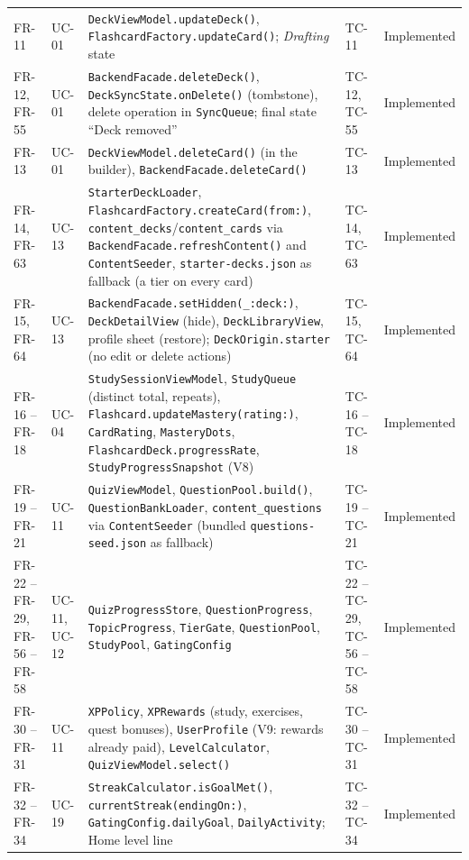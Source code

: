 \documentclass[12pt,letterpaper]{article}
\begin{document}
\begin{xltabular}{\textwidth}{@{}l L{1.6cm} Y L{2.0cm} L{1.9cm}@{}}
FR-11 & UC-01 & \texttt{DeckViewModel.updateDeck()}, \texttt{FlashcardFactory.updateCard()}; \emph{Drafting} state & TC-11 & Implemented \\
FR-12, FR-55 & UC-01 & \texttt{BackendFacade.deleteDeck()}, \texttt{DeckSyncState.onDelete()} (tombstone), delete operation in \texttt{SyncQueue}; final state ``Deck removed'' & TC-12, TC-55 & Implemented \\
FR-13 & UC-01 & \texttt{DeckViewModel.deleteCard()} (in the builder), \texttt{BackendFacade.deleteCard()} & TC-13 & Implemented \\
FR-14, FR-63 & UC-13 & \texttt{StarterDeckLoader}, \texttt{FlashcardFactory.createCard(from:)}, \texttt{content\_decks}/\texttt{content\_cards} via \texttt{BackendFacade.refreshContent()} and \texttt{ContentSeeder}, \texttt{starter-decks.json} as fallback (a tier on every card) & TC-14, TC-63 & Implemented \\
FR-15, FR-64 & UC-13 & \texttt{BackendFacade.setHidden(\_:deck:)}, \texttt{DeckDetailView} (hide), \texttt{DeckLibraryView}, profile sheet (restore); \texttt{DeckOrigin.starter} (no edit or delete actions) & TC-15, TC-64 & Implemented \\
FR-16 -- FR-18 & UC-04 & \texttt{StudySessionViewModel}, \texttt{StudyQueue} (distinct total, repeats), \texttt{Flashcard.updateMastery(rating:)}, \texttt{CardRating}, \texttt{MasteryDots}, \texttt{FlashcardDeck.progressRate}, \texttt{StudyProgressSnapshot} (V8) & TC-16 -- TC-18 & Implemented \\
FR-19 -- FR-21 & UC-11 & \texttt{QuizViewModel}, \texttt{QuestionPool.build()}, \texttt{QuestionBankLoader}, \texttt{content\_questions} via \texttt{ContentSeeder} (bundled \texttt{questions-seed.json} as fallback) & TC-19 -- TC-21 & Implemented \\
FR-22 -- FR-29, FR-56 -- FR-58 & UC-11, UC-12 & \texttt{QuizProgressStore}, \texttt{QuestionProgress}, \texttt{TopicProgress}, \texttt{TierGate}, \texttt{QuestionPool}, \texttt{StudyPool}, \texttt{GatingConfig} & TC-22 -- TC-29, TC-56 -- TC-58 & Implemented \\
FR-30 -- FR-31 & UC-11 & \texttt{XPPolicy}, \texttt{XPRewards} (study, exercises, quest bonuses), \texttt{UserProfile} (V9: rewards already paid), \texttt{LevelCalculator}, \texttt{QuizViewModel.select()} & TC-30 -- TC-31 & Implemented \\
FR-32 -- FR-34 & UC-19 & \texttt{StreakCalculator.isGoalMet()}, \texttt{currentStreak(endingOn:)}, \texttt{GatingConfig.dailyGoal}, \texttt{DailyActivity}; Home level line & TC-32 -- TC-34 & Implemented \\

\end{xltabular}
\end{document}
